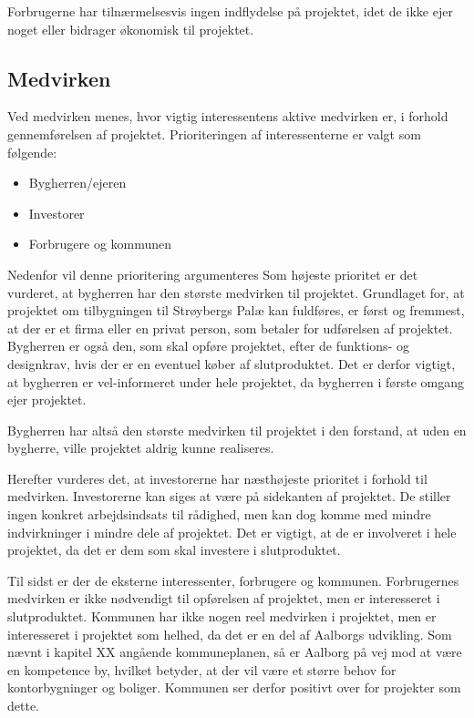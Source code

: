 Forbrugerne har tilnærmelsesvis ingen indflydelse på projektet, idet de ikke ejer noget eller bidrager økonomisk til projektet.

\subsection{Medvirken}
Ved medvirken menes, hvor vigtig interessentens aktive medvirken er, i forhold gennemførelsen af projektet. Prioriteringen af interessenterne er valgt som følgende:

\begin{itemize}
\item Bygherren/ejeren
\item Investorer
\item Forbrugere og kommunen
\end{itemize}

Nedenfor vil denne prioritering argumenteres
Som højeste prioritet er det vurderet, at bygherren har den største medvirken til projektet. Grundlaget for, at projektet om tilbygningen til Strøybergs Palæ kan fuldføres, er først og fremmest, at der er et firma eller en privat person, som betaler for udførelsen af projektet. Bygherren er også den, som skal opføre projektet, efter de funktions- og designkrav, hvis der er en eventuel køber af slutproduktet. Det er derfor vigtigt, at bygherren er vel-informeret under hele projektet, da bygherren i første omgang ejer projektet. 

Bygherren har altså den største medvirken til projektet i den forstand, at uden en bygherre, ville projektet aldrig kunne realiseres. 

Herefter vurderes det, at investorerne har næsthøjeste prioritet i forhold til medvirken. Investorerne kan siges at være på sidekanten af projektet. De stiller ingen konkret arbejdsindsats til rådighed, men kan dog komme med mindre indvirkninger i mindre dele af projektet. Det er vigtigt, at de er involveret i hele projektet, da det er dem som skal investere i slutproduktet. 

Til sidst er der de eksterne interessenter, forbrugere og kommunen. Forbrugernes medvirken er ikke nødvendigt til opførelsen af projektet, men er interesseret i slutproduktet.  Kommunen har ikke nogen reel medvirken i projektet, men er interesseret i projektet som helhed, da det er en del af Aalborgs udvikling. Som nævnt i kapitel XX angående kommuneplanen, så er Aalborg på vej mod at være en kompetence by, hvilket betyder, at der vil være et større behov for kontorbygninger og boliger. Kommunen ser derfor positivt over for projekter som dette.

